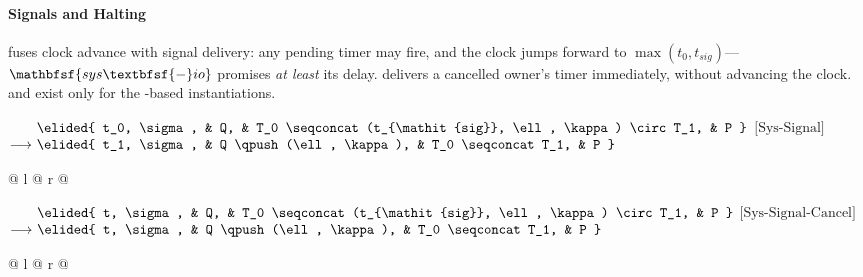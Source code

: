 \vspace{1em}
\paragraph{Signals and Halting}
 fuses clock advance with signal delivery: any pending timer may fire, and the clock jumps forward to $\max(t_0, t_{\mathit{sig}})$---$\mathbfsf{sys\textbfsf{-}io}$ promises \emph{at least} its delay.  delivers a cancelled owner's timer immediately, without advancing the clock.  and  exist only for the \exn-based instantiations.

\noindent
$\begin{array}[t]{@{}r@{\ }l@{\ }l@{\ }l@{\ }l@{}}
                & \elided{ t_0, \sigma, & Q, & T_0 \seqconcat (t_{\mathit{sig}}, \ell, \kappa) \circ T_1, & P } \\
\longrightarrow & \elided{ t_1, \sigma, & Q \qpush (\ell, \kappa), & T_0 \seqconcat T_1, & P }
\end{array}$\hfill$\text{[Sys-Signal]}$\par
\noindent
\begin{tabular*}{\linewidth}{@{} l @{\extracolsep{\fill}} r @{}}
\end{tabular*}

\vspace{1em}
\noindent
$\begin{array}[t]{@{}r@{\ }l@{\ }l@{\ }l@{\ }l@{}}
                & \elided{ t, \sigma, & Q, & T_0 \seqconcat (t_{\mathit{sig}}, \ell, \kappa) \circ T_1, & P } \\
\longrightarrow & \elided{ t, \sigma, & Q \qpush (\ell, \kappa), & T_0 \seqconcat T_1, & P }
\end{array}$\hfill$\text{[Sys-Signal-Cancel]}$\par
\noindent
\begin{tabular*}{\linewidth}{@{} l @{\extracolsep{\fill}} r @{}}
\end{tabular*}

